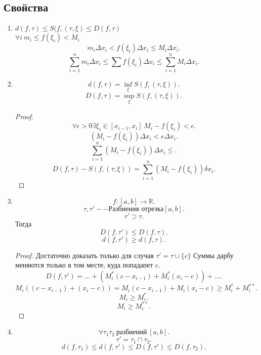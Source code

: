 \documentclass{scrartcl}
\begin{document}
\subsection{Свойства}
\begin{enumerate}
    \item $d(f,\tau) \le  S(f,(\tau,\xi) \le D(f,\tau)$ \\
     $\forall i ~ m_{i} \le f(\xi_{i}) < M_{i}$
     \[
     m_{i} \Delta x_{i} < f(\xi_{i}) \Delta x_{i} \le  M_{i} \Delta x_{i}
     .\]
     \[
     \sum_{i = 1}^{n} m_{i} \Delta x_{i} \le  \sum f(\xi_{i}) \Delta x_{i} \le 
     \sum_{i = 1}^{n} M_{i} \Delta x_{i}
     .\] 
\item
      \[
     d(f,\tau) = \inf_{\xi} S(f,(\tau,\xi))
     .\] 
     \[
     D(f,\tau) = \sup_{\xi} S(f,(\tau,\xi))
     .\] 
     \begin{proof}
         \[
             \forall  \epsilon > 0 \exists \xi_{i} \in [x_{i -1},x_{i}] ~
             M_{i} - f(\xi_{i}) < \epsilon
         .\] 
         \[
         ( M_{i} - f(\xi_{i}) ) \Delta x_{i} < e \Delta x_{i}
         .\] 
         \[
         \sum_{i = 1}^{n} (M_{i} - f(\xi_{i}))\Delta x_{i} \le 
         .\] 
         \[
         D(f,\tau) - S(f,(\tau,\xi)) = \sum_{i = 1}^{n} (M_{i} - f(\xi_{i})) \delta x_{i}
         .\] 
     \end{proof}
 \item  
     \[
         f:[a,b] \to \mathbb{R}
     .\] 
     \[
         \tau,\tau' -- \text{Разбиения отрезка} [a,b]
     .\] 
     \[
     \tau' \supset \tau
     .\] 
     Тогда
     \[
     D(f,\tau') \le  D(f,\tau)
     .\] 
     \[
     d(f,\tau') \ge d(f,\tau)
     .\] 
     \begin{proof}
         Достаточно доказать только для случая $\tau' = \tau \cup \{c\}$
         Суммы дарбу меняются только в том месте, куда попадапет c.
         \[
         D(f,\tau') = \dots + (M_{i}^{*} (c - x_{i - 1}) + M_{i}^{*}(x_{i} - c)) + \dots
         .\] 
         \[
         M_{i}((c - x_{i - 1}) + (x_{i} - c)) = M_{i}(c - x_{i - 1}) + M_{i}(x_{i} - c) \ge  M_{i}^{*}+M_{i}^{**}
         .\] 
         \[
         M_{i} \ge  M_{i}^{*}
         .\] 
         \[
         M_{i} \ge  M_{i}^{**}
         .\] 
     \end{proof}
    \item
        \[
            \forall  \tau_1 \tau_2 ~\text{разбиений} ~ [a,b]
        .\] 
        \[
            \tau' = \tau_1 \cap \tau_2
        .\] 
        \[
        d(f,\tau_1) \le  d(f,\tau') \le D(f,\tau') \le D(f,\tau_{2})
        .\] 
\end{enumerate}
\end{document}

